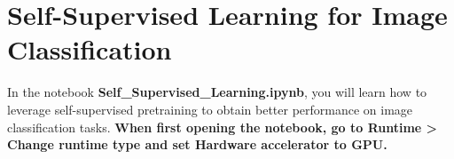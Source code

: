 \section{Self-Supervised Learning for Image Classification}

 In the notebook \textbf{Self\_Supervised\_Learning.ipynb}, you will learn how to leverage self-supervised pretraining to obtain better performance on image classification tasks. \textbf{When first opening the notebook, go to Runtime > Change runtime type and set Hardware accelerator to GPU.}